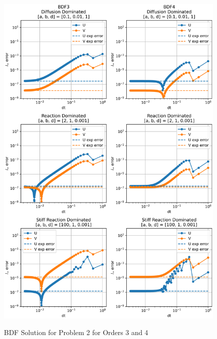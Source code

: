 \begin{figure}[t]
  \centering
  \includegraphics[width=5.75in]{images/BDF3BDF4problem2.png}\\
  \caption{BDF Solution for Problem 2 for Orders 3 and 4}
  \label{fig:errorProblem2BDF3and4}
\end{figure} 


